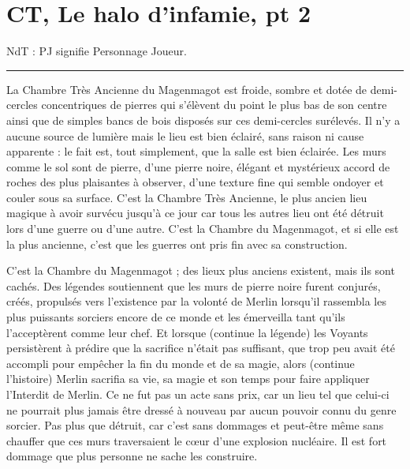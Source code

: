 
\chapter{CT, Le halo d'infamie, pt 2}

NdT : PJ signifie Personnage Joueur.
\par\noindent\rule{\textwidth}{0.4pt}
La Chambre Très Ancienne du Magenmagot est froide, sombre et dotée de demi-cercles concentriques de pierres qui s'élèvent du point le plus bas de son centre ainsi que de simples bancs de bois disposés sur ces demi-cercles surélevés. Il n'y a aucune source de lumière mais le lieu est bien éclairé, sans raison ni cause apparente : le fait est, tout simplement, que la salle est bien éclairée. Les murs comme le sol sont de pierre, d'une pierre noire, élégant et mystérieux accord de roches des plus plaisantes à observer, d'une texture fine qui semble ondoyer et couler sous sa surface. C'est la Chambre Très Ancienne, le plus ancien lieu magique à avoir survécu jusqu'à ce jour car tous les autres lieu ont été détruit lors d'une guerre ou d'une autre. C'est la Chambre du Magenmagot, et si elle est la plus ancienne, c'est que les guerres ont pris fin avec sa construction.

C'est la Chambre du Magenmagot ; des lieux plus anciens existent, mais ils sont cachés. Des légendes soutiennent que les murs de pierre noire furent conjurés, créés, propulsés vers l'existence par la volonté de Merlin lorsqu'il rassembla les plus puissants sorciers encore de ce monde et les émerveilla tant qu'ils l'acceptèrent comme leur chef. Et lorsque (continue la légende) les Voyants persistèrent à prédire que la sacrifice n'était pas suffisant, que trop peu avait été accompli pour empêcher la fin du monde et de sa magie, alors (continue l'histoire) Merlin sacrifia sa vie, sa magie et son temps pour faire appliquer l'Interdit de Merlin. Ce ne fut pas un acte sans prix, car un lieu tel que celui-ci ne pourrait plus jamais être dressé à nouveau par aucun pouvoir connu du genre sorcier. Pas plus que détruit, car c'est sans dommages et peut-être même sans chauffer que ces murs traversaient le cœur d'une explosion nucléaire. Il est fort dommage que plus personne ne sache les construire.

